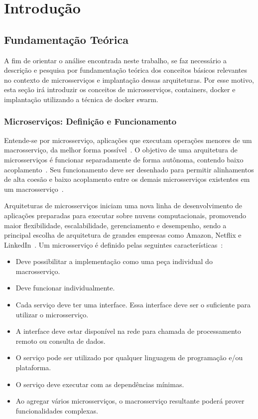 \chapter{Introdução}
\label{cap1}


\section{Fundamentação Teórica}


A fim de orientar o análise encontrada neste trabalho, se faz necessário a descrição e pesquisa por fundamentação teórica dos conceitos básicos relevantes no contexto de microsserviços e implantação dessas arquiteturas.
%
Por esse motivo, esta seção irá introduzir os conceitos de microsserviços, containers, docker e implantação utilizando a técnica de docker swarm.


\subsection{Microserviços: Definição e Funcionamento}

Entende-se por microsserviço, aplicações que executam operações menores de um macrosserviço, da melhor forma possível~\cite{stephenclarkewillson2017, Newman2015Feb}.
%
O objetivo de uma arquitetura de microsserviços é funcionar separadamente de forma autônoma, contendo baixo acoplamento~\cite{Newman2015Feb}.
%
Seu funcionamento deve ser desenhado para permitir alinhamentos de alta coesão e baixo acoplamento entre os demais microsserviços existentes em um macrosserviço~\cite{8169955}.



Arquiteturas de microsserviços iniciam uma nova linha de desenvolvimento de aplicações preparadas para executar sobre nuvens computacionais, promovendo maior flexibilidade, escalabilidade, gerenciamento e desempenho, sendo a principal escolha de arquitetura de grandes empresas como Amazon, Netflix e LinkedIn~\cite{7830692,7515686}.
%
Um microsserviço é definido pelas seguintes características~\cite{8169955}:



\begin{itemize}
  \item Deve possibilitar a implementação como uma peça individual do macrosserviço.
  \item Deve funcionar individualmente.
  \item Cada serviço deve ter uma interface. Essa interface deve ser o suficiente para utilizar o microsserviço.
  \item A interface deve estar disponível na rede para chamada de processamento remoto ou consulta de dados.
  \item O serviço pode ser utilizado por qualquer linguagem de programação e/ou plataforma.
  \item O serviço deve executar com as dependências mínimas.
  \item Ao agregar vários microsserviços, o macrosserviço resultante poderá prover funcionalidades complexas.
\end{itemize}



